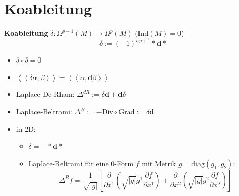 \documentclass[handout]{beamer}
\renewcommand{\d}{\textbf{d}}
\newcommand{\ablx}[2]{\frac{\partial #1}{\partial x^{#2}}}
\begin{document}
  
  
  \section{Koableitung}

  \begin{frame}
    \begin{block}{\textbf{Koableitung} \( \delta: \Omega^{p+1}(M) \longrightarrow \Omega^{p}(M) \) \qquad (Ind\( (M)=0 \))}
      \pause
      \[ \delta := (-1)^{np+1} * \d * \]
      \begin{itemize}
        \item<3-> \( \delta\circ\delta = 0 \) 
        \item<4-> \( \left\langle\left\langle \delta\alpha , \beta \right\rangle\right\rangle = \left\langle\left\langle \alpha , \d\beta \right\rangle\right\rangle \)
        \item<5-> Laplace-De-Rham: \( \Delta^{dR} := \delta\d + \d\delta \)
        \item<6-> Laplace-Beltrami: \( \Delta^{B} := -\text{Div}\circ\text{Grad} := \delta\d \)
        \item<7-> in 2D:
              \begin{itemize}
                \item \( \delta = - * \d * \)
                \item Laplace-Beltrami für eine \( 0 \)-Form \( f \) mit Metrik \( g=\text{diag}(g_{1}, g_{2}) \):
                      \[ \Delta^{B}f = \frac{1}{\sqrt{|g|}} \left[ \ablx{}{1}\left( \sqrt{|g|}g^{1}\ablx{f}{1}\right) +  \ablx{}{2}\left( \sqrt{|g|}g^{2}\ablx{f}{2}\right)\right] \]
              \end{itemize}
      \end{itemize}
    \end{block}
  \end{frame}

  
\end{document}

